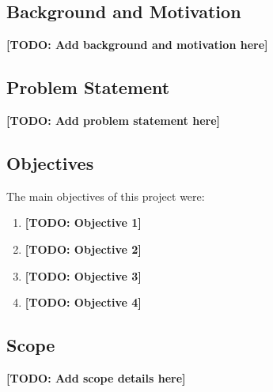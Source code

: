 
\subsection{Background and Motivation}


\textbf{[TODO: Add background and motivation here]}

\subsection{Problem Statement}


\textbf{[TODO: Add problem statement here]}

\subsection{Objectives}


The main objectives of this project were:

\begin{enumerate}
  \item \textbf{[TODO: Objective 1]}
  \item \textbf{[TODO: Objective 2]}
  \item \textbf{[TODO: Objective 3]}
  \item \textbf{[TODO: Objective 4]}
\end{enumerate}

\subsection{Scope}


\textbf{[TODO: Add scope details here]}

